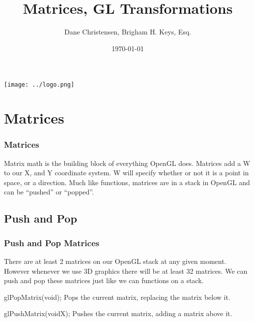\documentclass{beamer}
\title[GL Transformations]{Matrices, GL Transformations} %
\author{Dane Christensen, Brigham H. Keys, Esq.} %
\institute[] {
            \medskip
            \textit{bkeys@bkeys.org} %
          }
\date{\today} %
\begin{document}
          \begin{frame}
            \titlepage %
            \texttt{[image: ../logo.png]}
          \end{frame}


          \section{Matrices} %

          \begin{frame}
            \frametitle{Matrices}
            Matrix math is the building block of everything OpenGL does. Matrices add a W to our X, and Y coordinate system. W will specify whether or not it is a point in space, or a direction. Much like functions, matrices are in a stack in OpenGL and can be ``pushed'' or ``popped''.
          \end{frame}

          \subsection{Push and Pop}
          \begin{frame}
            \frametitle{Push and Pop Matrices}
            There are at least 2 matrices on our OpenGL stack at any given moment. However whenever we use 3D graphics there will be at least 32 matrices. We can push and pop these matrices just like we can functions on a stack.\\
            \begin{block}{glPopMatrix(void);}
              Pops the current matrix, replacing the matrix below it.\\
            \end{block}

            \begin{block}{glPushMatrix(voidX);}
              Pushes the current matrix, adding a matrix above it.\\
            \end{block}
          \end{frame}
\end{document}
